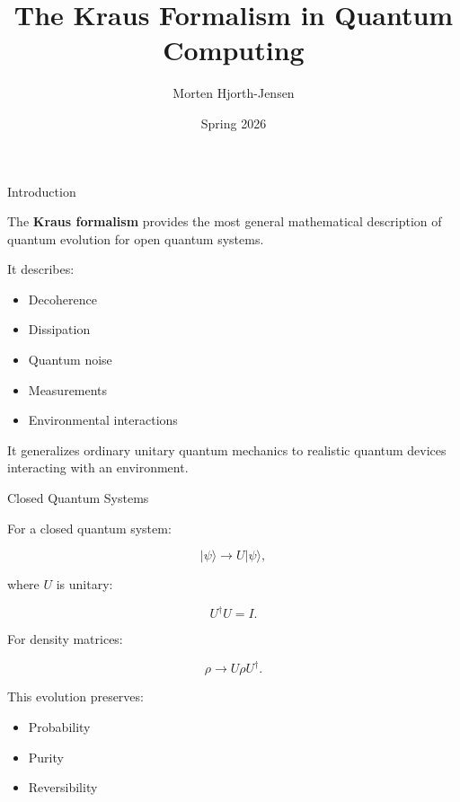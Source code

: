 \documentclass{beamer}
\title{The Kraus Formalism in Quantum Computing}
\author{Morten Hjorth-Jensen}
\date{Spring 2026}
\begin{document}
\begin{frame}
\titlepage
\end{frame}

\begin{frame}{Introduction}

The \textbf{Kraus formalism} provides the most general mathematical
description of quantum evolution for open quantum systems.

\vspace{0.3cm}

It describes:
\begin{itemize}
    \item Decoherence
    \item Dissipation
    \item Quantum noise
    \item Measurements
    \item Environmental interactions
\end{itemize}

\vspace{0.3cm}

It generalizes ordinary unitary quantum mechanics to realistic
quantum devices interacting with an environment.

\end{frame}

\begin{frame}{Closed Quantum Systems}

For a closed quantum system:

\[
|\psi\rangle \rightarrow U |\psi\rangle,
\]

where \(U\) is unitary:

\[
U^\dagger U = I.
\]

\vspace{0.4cm}

For density matrices:

\[
\rho \rightarrow U \rho U^\dagger.
\]

\vspace{0.3cm}

This evolution preserves:
\begin{itemize}
    \item Probability
    \item Purity
    \item Reversibility
\end{itemize}

\end{frame}
\end{document}
